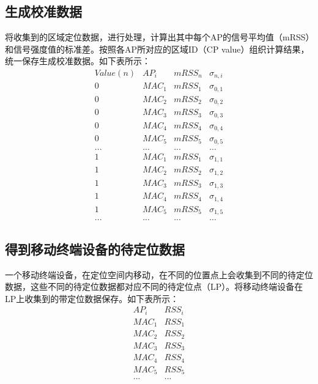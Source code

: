 \documentclass[a4paper, UTF8]{ctexart}
\begin{document}
\subsection{生成校准数据}
将收集到的区域定位数据，进行处理，计算出其中每个AP的信号平均值（mRSS）和信号强度值的标准差。按照各AP所对应的区域ID（CP value）组织计算结果，统一保存生成校准数据。如下表所示：
\begin{equation}
  \begin{array}{c|c|c|c}
    Value(n) & AP_{i} & mRSS_{n} & \sigma_{n,i} \\
    \hline
    0 & MAC_{1} & mRSS_{1} & \sigma_{0,1} \\
    0 & MAC_{2} & mRSS_{2} & \sigma_{0,2} \\
    0 & MAC_{3} & mRSS_{3} & \sigma_{0,3} \\
    0 & MAC_{4} & mRSS_{4} & \sigma_{0,4} \\
    0 & MAC_{5} & mRSS_{5} & \sigma_{0,5} \\
    ... & ... & ... & ...\\
    1 & MAC_{1} & mRSS_{1} & \sigma_{1,1} \\
    1 & MAC_{2} & mRSS_{2} & \sigma_{1,2} \\
    1 & MAC_{3} & mRSS_{3} & \sigma_{1,3} \\
    1 & MAC_{4} & mRSS_{4} & \sigma_{1,4} \\
    1 & MAC_{5} & mRSS_{5} & \sigma_{1,5} \\
    ... & ... & ... & ...
  \end{array}
\end{equation}
\subsection{得到移动终端设备的待定位数据}
一个移动终端设备，在定位空间内移动，在不同的位置点上会收集到不同的待定位数据，这些不同的待定位数据都对应不同的待定位点（LP）。将移动终端设备在LP上收集到的带定位数据保存。如下表所示：
\begin{equation}
  \begin{array}{c|c}
    AP_{i} & RSS_{i}\\
    \hline
    MAC_{1} & RSS_{1}\\
    MAC_{2} & RSS_{2}\\
    MAC_{3} & RSS_{3}\\
    MAC_{4} & RSS_{4}\\
    MAC_{5} & RSS_{5}\\
    ... & ...
  \end{array}
\end{equation}
\end{document}
